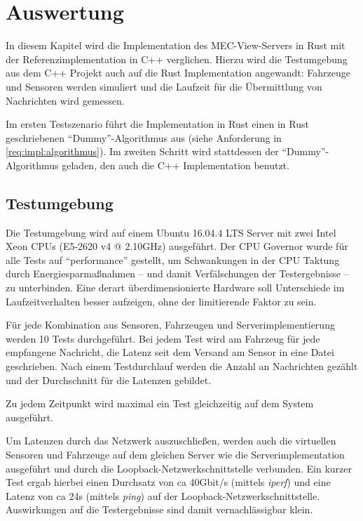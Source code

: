 
			
\chapter{Auswertung}

In diesem Kapitel wird die Implementation des MEC-View-Servers in Rust mit der Referenzimplementation in C++ verglichen.
Hierzu wird die Testumgebung aus dem C++ Projekt auch auf die Rust Implementation angewandt: Fahrzeuge und Sensoren werden simuliert und die Laufzeit für die Übermittlung von Nachrichten wird gemessen.

Im ersten Testszenario führt die Implementation in Rust einen in Rust geschriebenen \enquote{Dummy}-Algorithmus aus (siehe Anforderung  in \autoref{req:impl:algorithmus}).
Im zweiten Schritt wird stattdessen der \enquote{Dummy}-Algorithmus geladen, den auch die C++ Implementation benutzt.



\section{Testumgebung}

Die Testumgebung wird auf einem Ubuntu 16.04.4 LTS Server mit zwei Intel Xeon CPUs (E5-2620 v4 @ 2.10GHz) ausgeführt.
Der CPU Governor wurde für alle Tests auf \enquote{performance} gestellt, um Schwankungen in der CPU Taktung durch Energiesparmaßnahmen -- und damit Verfälschungen der Testergebnisse -- zu unterbinden.
Eine derart überdimensionierte Hardware soll Unterschiede im Laufzeitverhalten besser aufzeigen, ohne der limitierende Faktor zu sein.

Für jede Kombination aus Sensoren, Fahrzeugen und Serverimplementierung werden 10 Tests durchgeführt.
Bei jedem Test wird am Fahrzeug für jede empfangene Nachricht, die Latenz seit dem Versand am Sensor in eine Datei geschrieben.
Nach einem Testdurchlauf werden die Anzahl an Nachrichten gezählt und der Durchschnitt für die Latenzen gebildet.

Zu jedem Zeitpunkt wird maximal ein Test gleichzeitig auf dem System ausgeführt.

Um Latenzen durch das Netzwerk auszuschließen, werden auch die virtuellen Sensoren und Fahrzeuge auf dem gleichen Server wie die Serverimplementation ausgeführt und durch die Loopback-Netzwerkschnittstelle verbunden.
Ein kurzer Test ergab hierbei einen Durchsatz von ca 40Gbit/s (mittels \textit{iperf}) und eine Latenz von ca 24\textmu{}s (mittels \textit{ping}) auf der Loopback-Netzwerkschnittstelle.
Auswirkungen auf die Testergebnisse sind damit vernachlässigbar klein.

